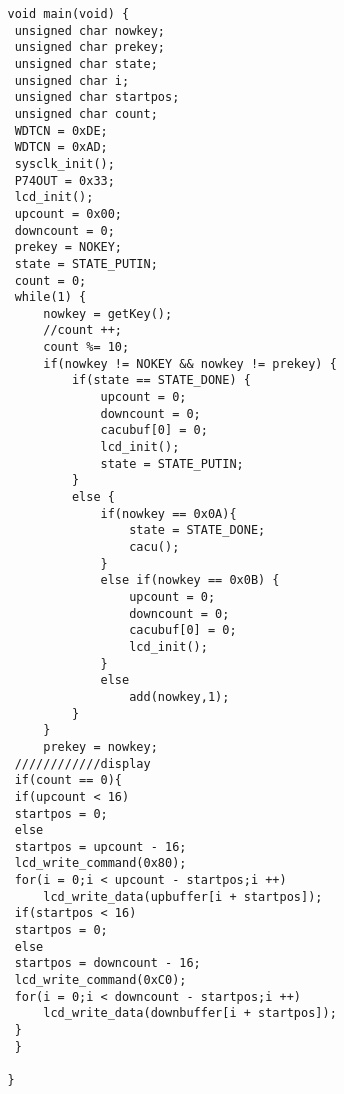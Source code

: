 \documentclass{article}
\begin{document}
\begin{CJK}{UTF8}{gkai}
\begin{lstlisting}
   void main(void) {
   	unsigned char nowkey;
   	unsigned char prekey;
   	unsigned char state;
   	unsigned char i;
   	unsigned char startpos;
   	unsigned char count;
   	WDTCN = 0xDE;
   	WDTCN = 0xAD;
   	sysclk_init();
   	P74OUT = 0x33;
   	lcd_init();
   	upcount = 0x00;
   	downcount = 0;
   	prekey = NOKEY;
   	state = STATE_PUTIN;
   	count = 0;
   	while(1) {
   		nowkey = getKey();
   		//count ++;
   		count %= 10;
   		if(nowkey != NOKEY && nowkey != prekey) {
   			if(state == STATE_DONE) {
   				upcount = 0;
   				downcount = 0;
   				cacubuf[0] = 0;
   				lcd_init();
   				state = STATE_PUTIN;
   			}
   			else {
   				if(nowkey == 0x0A){
   					state = STATE_DONE;
   					cacu();
   				}
   				else if(nowkey == 0x0B) {
   					upcount = 0;
   					downcount = 0;
   					cacubuf[0] = 0;
   					lcd_init();
   				}
   				else
   					add(nowkey,1);
   			}
   		}
   	 	prekey = nowkey;
   	////////////display
   	if(count == 0){
   	if(upcount < 16)
   	startpos = 0;
   	else
   	startpos = upcount - 16;
   	lcd_write_command(0x80);
   	for(i = 0;i < upcount - startpos;i ++)
   		lcd_write_data(upbuffer[i + startpos]);
   	if(startpos < 16)
   	startpos = 0;
   	else
   	startpos = downcount - 16;
   	lcd_write_command(0xC0);
   	for(i = 0;i < downcount - startpos;i ++)
   		lcd_write_data(downbuffer[i + startpos]);
   	}
   	}

   }
\end{lstlisting}
\end{CJK}
\end{document}
